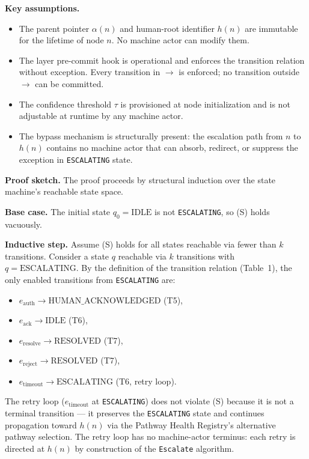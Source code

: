 \medskip\noindent\textbf{Key assumptions.}
\begin{itemize}\itemsep=0pt
\item[A1.] The parent pointer $\alpha(n)$ and human-root identifier $h(n)$ are immutable for the lifetime of node $n$. No machine actor can modify them.
\item[A2.] The \fact{} layer pre-commit hook is operational and enforces the transition relation without exception. Every transition in $\rightarrow$ is enforced; no transition outside $\rightarrow$ can be committed.
\item[A3.] The confidence threshold $\tau$ is provisioned at node initialization and is not adjustable at runtime by any machine actor.
\item[A4.] The bypass mechanism is structurally present: the escalation path from $n$ to $h(n)$ contains no machine actor that can absorb, redirect, or suppress the exception in \texttt{ESCALATING} state.
\end{itemize}

\medskip\noindent\textbf{Proof sketch.}
The proof proceeds by structural induction over the state machine's reachable state space.

\textbf{Base case.} The initial state $q_0 = \text{IDLE}$ is not \texttt{ESCALATING}, so (S) holds vacuously.

\textbf{Inductive step.} Assume (S) holds for all states reachable via fewer than $k$ transitions. Consider a state $q$ reachable via $k$ transitions with $q = \text{ESCALATING}$. By the definition of the transition relation (Table~1), the only enabled transitions from \texttt{ESCALATING} are:
\begin{itemize}\itemsep=0pt
\item $e_{\text{auth}} \to \text{HUMAN\_ACKNOWLEDGED}$ (T5),
\item $e_{\text{ack}} \to \text{IDLE}$ (T6),
\item $e_{\text{resolve}} \to \text{RESOLVED}$ (T7),
\item $e_{\text{reject}} \to \text{RESOLVED}$ (T7),
\item $e_{\text{timeout}} \to \text{ESCALATING}$ (T6, retry loop).
\end{itemize}
The retry loop ($e_{\text{timeout}}$ at \texttt{ESCALATING}) does not violate (S) because it is not a terminal transition --- it preserves the \texttt{ESCALATING} state and continues propagation toward $h(n)$ via the Pathway Health Registry's alternative pathway selection. The retry loop has no machine-actor terminus: each retry is directed at $h(n)$ by construction of the \texttt{Escalate} algorithm.

